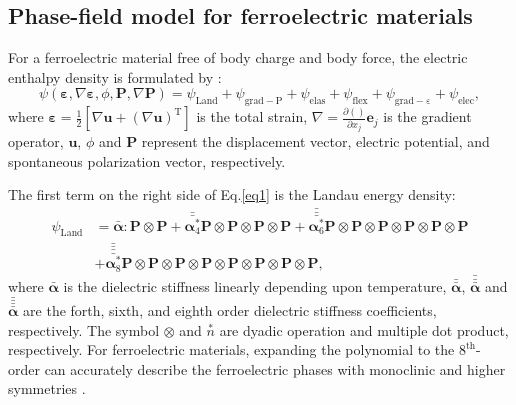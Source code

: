 \documentclass[times,fleqn,11pt]{elsarticle}
\begin{document}
\subsection{Phase-field model for ferroelectric materials}
For a ferroelectric material free of body charge and body force, the electric enthalpy density is formulated by \cite{gu_flexoelectricity_2014,jiang_polarization_2015}:
\begin{equation}\label{eq1}
    \psi(\mathbf{\varepsilon},\nabla\mathbf{\varepsilon},\phi,\mathbf{P},\nabla\mathbf{P})
    =\psi_\mathrm{Land}+\psi_\mathrm{grad-P}+\psi_\mathrm{elas}+\psi_\mathrm{flex}+\psi_\mathrm{grad-\varepsilon}+\psi_\mathrm{elec},
\end{equation}
where $\mathbf{\varepsilon}=\frac{1}{2}\left[\nabla \mathbf{u}+(\nabla\mathbf{u})^\mathrm{T}\right]$ is the total strain, $\nabla=\frac{\partial ()}{\partial x_j}\mathbf{e}_j $ is the gradient operator, $\mathbf{u}$, $\phi$ and $\mathbf{P}$ represent the displacement vector, electric potential, and spontaneous polarization vector, respectively.

The first term on the right side of Eq.\eqref{eq1} is the Landau energy density:
\begin{equation}
   \begin{split}
     \psi_\mathrm{Land}&=\bar{\mathbf{\alpha}}:\mathbf{P}\otimes\mathbf{P}+\bar{\bar{\mathbf{\alpha}^*_4}} \mathbf{P}\otimes\mathbf{P}\otimes\mathbf{P}\otimes\mathbf{P}+\bar{\bar{\bar{\mathbf{\alpha}^*_6}}}\mathbf{P}\otimes\mathbf{P}\otimes\mathbf{P}\otimes\mathbf{P}\otimes\mathbf{P}\otimes\mathbf{P}\\
    &+\bar{\bar{\bar{\bar{\mathbf{\alpha}^*_8}}}} \mathbf{P}\otimes\mathbf{P}\otimes\mathbf{P}\otimes\mathbf{P}\otimes\mathbf{P}\otimes\mathbf{P}\otimes\mathbf{P}\otimes\mathbf{P},
   \end{split}
\end{equation}
where $\bar{\mathbf{\alpha}}$ is the dielectric stiffness linearly depending upon temperature, $\bar{\bar{\mathbf{\alpha}}}$, $\bar{\bar{\bar{\mathbf{\alpha}}}}$ and $\bar{\bar{\bar{\bar{\mathbf{\alpha}}}}}$ are the forth, sixth, and eighth order dielectric stiffness coefficients, respectively. The symbol $\otimes$ and  $\overset{*}{n}$ are dyadic operation and multiple dot product, respectively. For ferroelectric materials, expanding the polynomial to the $8^\mathrm{th}$-order can accurately describe the ferroelectric phases with monoclinic and higher symmetries \cite{heitmann_thermodynamics_2014}.
\end{document}
